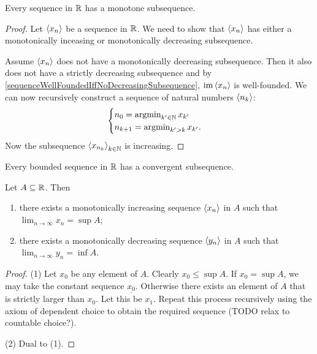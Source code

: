 \begin{proposition} \label{monotoneSubsequenceRealSequence}
Every sequence in $\mathbb{R}$ has a monotone subsequence.
\end{proposition}
\begin{proof}
Let $\left\langle x_n \right\rangle$ be a sequence in $\mathbb{R}$. We need to show that $\left\langle x_n \right\rangle$ has either a monotonically inceasing or monotonically decreasing subsequence.

Assume $\left\langle x_n \right\rangle$ does not have a monotonically decreasing subsequence. Then it also does not have a strictly decreasing subsequence and by \ref{sequenceWellFoundedIffNoDecreasingSubsequence}, $\operatorname{im}\left\langle x_n \right\rangle$ is well-founded. We can now recursively construct a sequence of natural numbers $\left\langle n_k \right\rangle$:
\[ \begin{cases}
n_0 = \operatorname{argmin}_{k'\in \mathbb{N}}x_{k'} \\
n_{k+1} = \operatorname{argmin}_{k'> k}x_{k'}.
\end{cases} \]
Now the subsequence $\left\langle x_{n_k} \right\rangle_{k\in \mathbb{N}}$ is increasing.
\end{proof}
\begin{corollary}
Every bounded sequence in $\mathbb{R}$ has a convergent subsequence. 
\end{corollary}

\begin{proposition} \label{sequencesToExtrema}
Let $A\subseteq \mathbb{R}$. Then
\begin{enumerate}
\item there exists a monotonically increasing sequence $\left\langle x_n \right\rangle$ in $A$ such that $\lim_{n\to\infty}x_n = \sup A$;
\item there exists a monotonically decreasing sequence $\left\langle y_n \right\rangle$ in $A$ such that $\lim_{n\to\infty}y_n = \inf A$.
\end{enumerate}
\end{proposition}
\begin{proof}
(1) Let $x_0$ be any element of $A$. Clearly $x_0\leq \sup A$. If $x_0 = \sup A$, we may take the constant sequence $\underline{x_0}$. Otherwise there exists an element of $A$ that is strictly larger than $x_0$. Let this be $x_1$. Repeat this process recursively using the axiom of dependent choice to obtain the required sequence (TODO relax to countable choice?).

(2) Dual to (1).
\end{proof}

